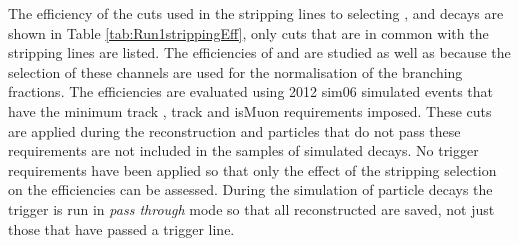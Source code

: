 The efficiency of the cuts used in the stripping lines to selecting \bmumu, \bhh and \bujpsik decays are shown in Table \ref{tab:Run1strippingEff}, only cuts that are in common with the \bmumu stripping lines are listed. The efficiencies of \bhh and \bujpsik are studied as well as \bmumu because the selection of these channels are used for the normalisation of the branching fractions. %
The efficiencies are evaluated using 2012 sim06 simulated events that have the minimum track \pt, track \chisqd and isMuon requirements imposed. These cuts are applied during the reconstruction and particles that do not pass these requirements are not included in the samples of simulated decays. No trigger requirements have been applied so that only the effect of the stripping selection on the efficiencies can be assessed. During the simulation of particle decays the trigger is run in {\it pass through} mode so that all reconstructed are saved, not just those that have passed a trigger line.

